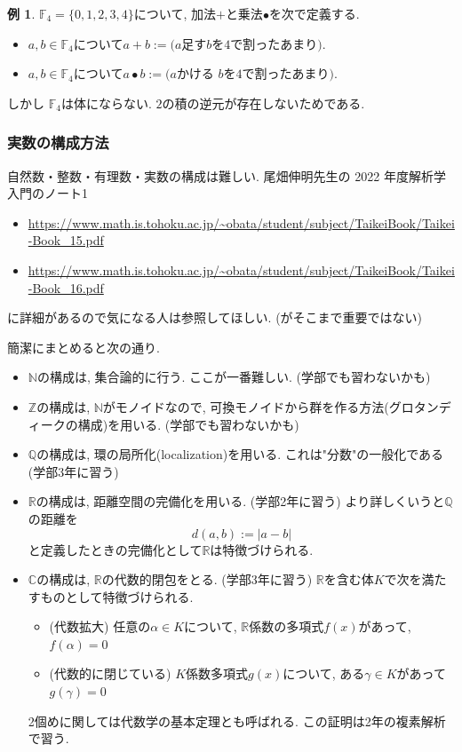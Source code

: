 \documentclass[dvipdfmx,a4paper,11pt]{article} %
\newcommand{\R}{\mathbb{R}}
\newcommand{\Z}{\mathbb{Z}}
\newcommand{\Q}{\mathbb{Q}}
\newcommand{\N}{\mathbb{N}}
\newcommand{\C}{\mathbb{C}}
\theoremstyle{definition}
\newtheorem{exa}[thm]{例}
\begin{document}
  \begin{exa}
  $\mathbb{F}_4=\{0,1 ,2, 3, 4\}$について, 
  加法$+ $と乗法$\bullet$を次で定義する.
  \begin{itemize}
  \item $a, b \in \mathbb{F}_4$について$a+b:=\text{($a$足す$b$を4で割ったあまり)}$. 
\item $a, b \in \mathbb{F}_4$について$a\bullet b:=\text{($a$かける $b$を4で割ったあまり)}$. 
 \end{itemize}
しかし  $\mathbb{F}_4$は体にならない. $2$の積の逆元が存在しないためである. 
  \end{exa}
  
\subsubsection{実数の構成方法}

自然数・整数・有理数・実数の構成は難しい. 
尾畑伸明先生の 2022 年度解析学入門のノート1
\begin{itemize}
\item \url{https://www.math.is.tohoku.ac.jp/~obata/student/subject/TaikeiBook/Taikei-Book_15.pdf}
\item \url{https://www.math.is.tohoku.ac.jp/~obata/student/subject/TaikeiBook/Taikei-Book_16.pdf}
\end{itemize}
に詳細があるので気になる人は参照してほしい. (がそこまで重要ではない)

簡潔にまとめると次の通り. 
\begin{itemize}
\item $\N$の構成は, 集合論的に行う. ここが一番難しい. (学部でも習わないかも)
\item $\Z$の構成は, $\N$がモノイドなので, 可換モノイドから群を作る方法(グロタンディークの構成)を用いる. (学部でも習わないかも)
\item $\Q$の構成は, 環の局所化(localization)を用いる. これは"分数"の一般化である (学部3年に習う)
\item $\R$の構成は, 距離空間の完備化を用いる. (学部2年に習う) 
より詳しくいうと$\Q$の距離を
$$
d(a, b):=|a-b|
$$
と定義したときの完備化として$\R$は特徴づけられる. 
\item $\C$の構成は, $\R$の代数的閉包をとる. (学部3年に習う) 
$\R$を含む体$K$で次を満たすものとして特徴づけられる. 
\begin{itemize}
\item (代数拡大) 任意の$\alpha \in K$について, $\R$係数の多項式$f(x)$があって, $f(\alpha)=0$
\item (代数的に閉じている) $K$係数多項式$g(x)$について, ある$\gamma \in K$があって$g(\gamma)=0$
\end{itemize}
2個めに関しては代数学の基本定理とも呼ばれる. この証明は2年の複素解析で習う.
\end{itemize}
\end{document}
